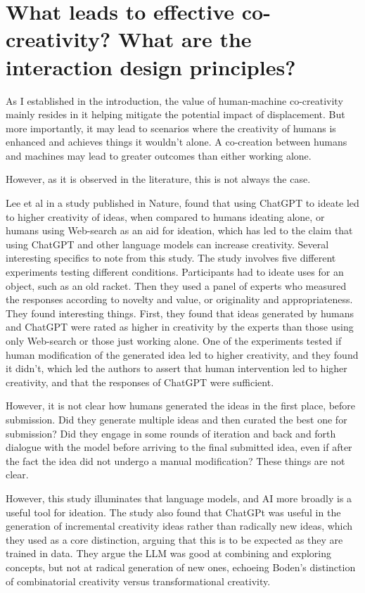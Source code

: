 \section{What leads to effective co-creativity? What are the interaction design principles?}

As I established in the introduction, the value of human-machine co-creativity mainly resides in it helping mitigate the potential impact of displacement. But more importantly, it may lead to scenarios where the creativity of humans is enhanced and achieves things it wouldn't alone. A co-creation between humans and machines may lead to greater outcomes than either working alone. 

However, as it is observed in the literature, this is not always the case. 

Lee et al \cite{Lee2024-hd} in a study published in Nature, found that using ChatGPT to ideate led to higher creativity of ideas, when compared to humans ideating alone, or humans using Web-search as an aid for ideation, which has led to the claim that using ChatGPT and other language models can increase creativity. Several interesting specifics to note from this study. The study involves five different experiments testing different conditions. Participants had to ideate uses for an object, such as an old racket. Then they used a panel of experts who measured the responses according to novelty and value, or originality and appropriateness. They found interesting things. First, they found that ideas generated by humans and ChatGPT were rated as higher in creativity by the experts than those using only Web-search or those just working alone. One of the experiments tested if human modification of the generated idea led to higher creativity, and they found it didn't, which led the authors to assert that human intervention led to higher creativity, and that the responses of ChatGPT were sufficient. 

However, it is not clear how humans generated the ideas in the first place, before submission. Did they generate multiple ideas and then curated the best one for submission? Did they engage in some rounds of iteration and back and forth dialogue with the model before arriving to the final submitted idea, even if after the fact the idea did not undergo a manual modification? These things are not clear. 

However, this study illuminates that language models, and AI more broadly is a useful tool for ideation. The study also found that ChatGPt was useful in the generation of incremental creativity ideas rather than radically new ideas, which they used as a core distinction, arguing that this is to be expected as they are trained in data. They argue the LLM was good at combining and exploring concepts, but not at radical generation of new ones, echoeing Boden's distinction of combinatorial creativity versus transformational creativity. 

